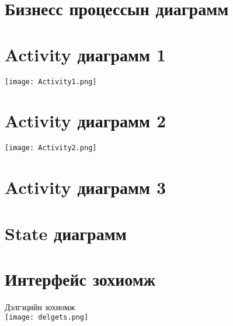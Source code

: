 \documentclass[12pt]{article}
\begin{document}
	\section{Бизнесс процессын диаграмм}
  
   	
   	\section{Activity диаграмм 1}
   	\texttt{[image: Activity1.png]} 
   	\section{Activity диаграмм 2}
   	\texttt{[image: Activity2.png]} 
   	\section{Activity диаграмм 3}
   	
   	
   	\section{State диаграмм }
   	\section{Интерфейс зохиомж }
   	Дэлгэцийн зохиомж \\
   	
  \texttt{[image: delgets.png]} 
   	
   	
   	
   	
\end{document}
